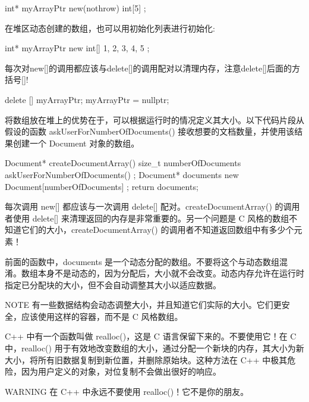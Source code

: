 \begin{cpp}
int* myArrayPtr { new(nothrow) int[5] };
\end{cpp}


在堆区动态创建的数组，也可以用初始化列表进行初始化:

\begin{cpp}
int* myArrayPtr { new int[] { 1, 2, 3, 4, 5 } };
\end{cpp}

每次对new[]的调用都应该与delete[]的调用配对以清理内存，注意delete[]后面的方括号[]!

\begin{cpp}
delete [] myArrayPtr;
myArrayPtr = nullptr;
\end{cpp}

将数组放在堆上的优势在于，可以根据运行时的情况定义其大小。以下代码片段从假设的函数 askUserForNumberOfDocuments() 接收想要的文档数量，并使用该结果创建一个 Document 对象的数组。

\begin{cpp}
Document* createDocumentArray()
{
    size_t numberOfDocuments { askUserForNumberOfDocuments() };
    Document* documents { new Document[numberOfDocuments] };
    return documents;
}
\end{cpp}

每次调用 new[] 都应该与一次调用 delete[] 配对。createDocumentArray() 的调用者使用 delete[] 来清理返回的内存是非常重要的。另一个问题是 C 风格的数组不知道它们的大小，createDocumentArray() 的调用者不知道返回数组中有多少个元素！

前面的函数中，documents 是一个动态分配的数组。不要将这个与动态数组混淆。数组本身不是动态的，因为分配后，大小就不会改变。动态内存允许在运行时指定已分配块的大小，但不会自动调整其大小以适应数据。

\begin{myNotic}{NOTE}
有一些数据结构会动态调整大小，并且知道它们实际的大小。它们更安全，应该使用这样的容器，而不是 C 风格数组。
\end{myNotic}

C++ 中有一个函数叫做 realloc()，这是 C 语言保留下来的。不要使用它！在 C 中，realloc() 用于有效地改变数组的大小，通过分配一个新块的内存，其大小为新大小，将所有旧数据复制到新位置，并删除原始块。这种方法在 C++ 中极其危险，因为用户定义的对象，对位复制不会做出很好的响应。

\begin{myWarning}{WARNING}
在 C++ 中永远不要使用 realloc()！它不是你的朋友。
\end{myWarning}

